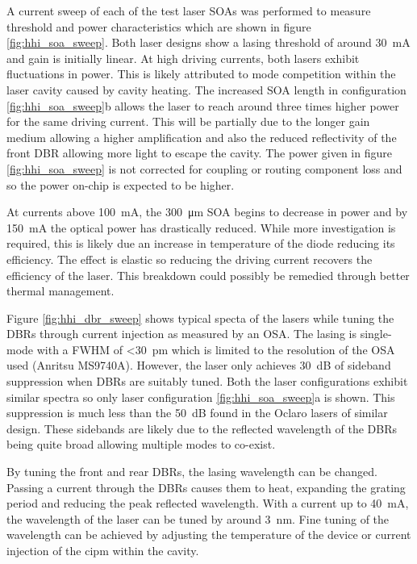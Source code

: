 A current sweep of each of the test laser \acp{SOA} was performed to measure threshold and power characteristics which are shown in figure \ref{fig:hhi_soa_sweep}. Both laser designs show a lasing threshold of around \SI{30}{\mA} and gain is initially linear. At high driving currents, both lasers exhibit fluctuations in power. This is likely attributed to mode competition within the laser cavity caused by cavity heating. The increased \ac{SOA} length in configuration \ref{fig:hhi_soa_sweep}b allows the laser to reach around three times higher power for the same driving current. This will be partially due to the longer gain medium allowing a higher amplification and also the reduced reflectivity of the front \ac{DBR} allowing more light to escape the cavity. The power given in figure \ref{fig:hhi_soa_sweep} is not corrected for coupling or routing component loss and so the power on-chip is expected to be higher. 

At currents above \SI{100}{\mA}, the \SI{300}{\um} \ac{SOA} begins to decrease in power and by \SI{150}{\mA} the optical power has drastically reduced. While more investigation is required, this is likely due an increase in temperature of the diode reducing its efficiency. The effect is elastic so reducing the driving current recovers the efficiency of the laser. This breakdown could possibly be remedied through better thermal management.


Figure \ref{fig:hhi_dbr_sweep} shows typical specta of the lasers while tuning the \acp{DBR} through current injection as measured by an \ac{OSA}. The lasing is single-mode with a \ac{FWHM} of \SI{<30}{pm} which is limited to the resolution of the \ac{OSA} used (Anritsu MS9740A). However, the laser only achieves \SI{30}{dB} of sideband suppression when \acp{DBR} are suitably tuned. Both the laser configurations exhibit similar spectra so only laser configuration \ref{fig:hhi_soa_sweep}a is shown. This suppression is much less than the \SI{50}{dB} found in the Oclaro lasers of similar design. These sidebands are likely due to the reflected wavelength of the \acp{DBR} being quite broad allowing multiple modes to co-exist. 

By tuning the front and rear \acp{DBR}, the lasing wavelength can be changed. Passing a current through the \acp{DBR} causes them to heat, expanding the grating period and reducing the peak reflected wavelength. With a current up to \SI{40}{\mA}, the wavelength of the laser can be tuned by around \SI{3}{nm}. Fine tuning of the wavelength can be achieved by adjusting the temperature of the device or current injection of the \ac{cipm} within the cavity. 

